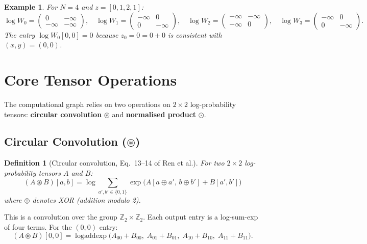 \documentclass[11pt,a4paper]{article}
\newtheorem{definition}{Definition}[section]
\newtheorem{example}{Example}[section]
\newcommand{\logsumexp}{\operatorname{logaddexp}}
\newcommand{\circconv}{\circledast}
\newcommand{\normprod}{\odot}
\begin{document}
\begin{example}
For $N = 4$ and $z = [0, 1, 2, 1]$:
\[
\log W_0 = \begin{pmatrix} 0 & -\infty \\ -\infty & -\infty \end{pmatrix}, \quad
\log W_1 = \begin{pmatrix} -\infty & 0 \\ 0 & -\infty \end{pmatrix}, \quad
\log W_2 = \begin{pmatrix} -\infty & -\infty \\ -\infty & 0 \end{pmatrix}, \quad
\log W_3 = \begin{pmatrix} -\infty & 0 \\ 0 & -\infty \end{pmatrix}.
\]
The entry $\log W_0[0,0] = 0$ because $z_0 = 0 = 0 + 0$ is consistent with $(x,y) = (0,0)$.
\end{example}


\section{Core Tensor Operations}
\label{sec:tensor_ops}

The computational graph relies on two operations on $2 \times 2$ log-probability tensors: \textbf{circular convolution} $\circconv$ and \textbf{normalised product} $\normprod$.

\subsection{Circular Convolution ($\circconv$)}
\label{subsec:circ_conv}

\begin{definition}[Circular convolution, Eq.~13--14 of Ren et al.]
For two $2 \times 2$ log-probability tensors $A$ and $B$:
\[
(A \circconv B)[a, b] = \log \sum_{a', b' \in \{0,1\}} \exp\!\big( A[a \oplus a',\, b \oplus b'] + B[a', b'] \big)
\]
where $\oplus$ denotes XOR (addition modulo 2).
\end{definition}

This is a convolution over the group $\mathbb{Z}_2 \times \mathbb{Z}_2$. Each output entry is a log-sum-exp of four terms. For the $(0,0)$ entry:
\[
(A \circconv B)[0,0] = \logsumexp\big(A_{00} + B_{00},\; A_{01} + B_{01},\; A_{10} + B_{10},\; A_{11} + B_{11}\big).
\]
\end{document}
